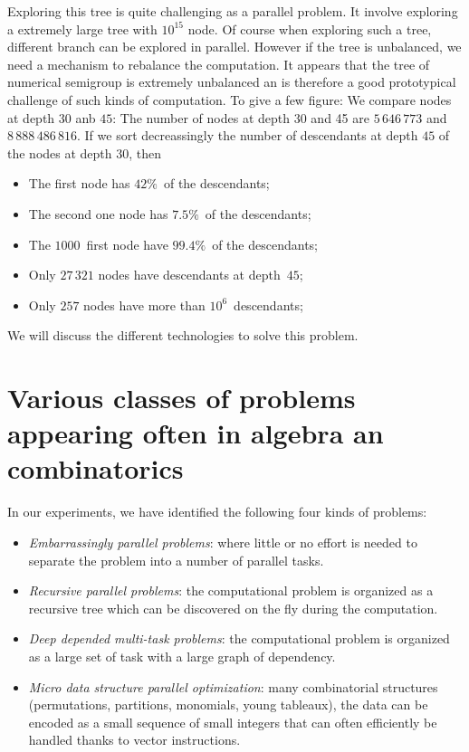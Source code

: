 \documentclass{deliverablereport}
\begin{document}
Exploring this tree is quite challenging as a parallel problem. It involve
exploring a extremely large tree with $10^{15}$ node. Of course when exploring
such a tree, different branch can be explored in parallel. However if the tree
is unbalanced, we need a mechanism to rebalance the computation. It appears
that the tree of numerical semigroup is extremely unbalanced an is therefore a
good prototypical challenge of such kinds of computation. To give a few
figure: We compare nodes at depth $30$ anb $45$: The number of nodes at depth
30 and 45 are $5\,646\,773$ and $8\,888\,486\,816$. If we sort decreassingly
the number of descendants at depth $45$ of the nodes at depth $30$, then
\begin{itemize}
\item The first node has $42\%$~of the descendants;
\item The second one node has $7.5\%$~of the descendants;
\item The $1000$~first node have $99.4\%$~of the descendants;
\item Only $27\,321$ nodes have descendants at depth~$45$;
\item Only $257$ nodes have more than $10^6$~descendants;
\end{itemize}
We will discuss the different technologies to solve this problem.

 
\section{Various classes of problems appearing often in algebra an combinatorics}

In our experiments, we have identified the following four kinds of problems:
\begin{itemize}
\item \emph{Embarrassingly parallel problems}: where little or no effort is
  needed to separate the problem into a number of parallel tasks.
\item \emph{Recursive parallel problems}: the computational problem is
  organized as a recursive tree which can be discovered on the fly during the
  computation.
\item \emph{Deep depended multi-task problems}: the computational problem is
  organized as a large set of task with a large graph of dependency.
\item \emph{Micro data structure parallel optimization}: many combinatorial
  structures (permutations, partitions, monomials, young tableaux), the data
  can be encoded as a small sequence of small integers that can often
  efficiently be handled thanks to vector instructions.
\end{itemize}
\end{document}
